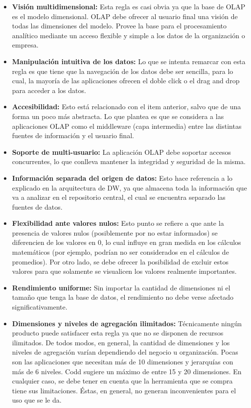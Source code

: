 \documentclass[a4paper,11pt]{article}
\begin{document}
\begin{flushleft}
    \begin{itemize}
      \item \textbf{Visión multidimensional:} Esta regla es casi obvia ya que la base de OLAP es el modelo dimensional. OLAP debe ofrecer al usuario final
      una visión de todas las dimensiones del modelo. Provee la base para el procesamiento analítico mediante un acceso flexible y simple a los datos de la 
      organización o empresa.
      \item \textbf{Manipulación intuitiva de los datos:} Lo que se intenta remarcar con esta regla es que tiene que la navegación de los datos debe ser
      sencilla, para lo cual, la mayoría de las aplicaciones ofrecen el doble click o el drag and drop para acceder a los datos.
      \item \textbf{Accesibilidad:} Esto está relacionado con el item anterior, salvo que de una forma un poco más abstracta. Lo que plantea es que se
      considera a las aplicaciones OLAP como el middleware (capa intermedia) entre las distintas fuentes de información y el usuario final.
      \item \textbf{Soporte de multi-usuario:} La aplicación OLAP debe soportar accesos concurrentes, lo que conlleva mantener la integridad y seguridad
      de la misma.
      \item \textbf{Información separada del origen de datos:} Esto hace referencia a lo explicado en la arquitectura de DW, ya que almacena toda la
      información que va a analizar en el repositorio central, el cual se encuentra separado las fuentes de datos.
      \item \textbf{Flexibilidad ante valores nulos:} Esto punto se refiere a que ante la presencia de valores nulos (posiblemente por no estar informados)
      se diferencien de los valores en 0, lo cual influye en gran medida en los cálculos matemáticos (por ejemplo, podrían no ser considerados en el cálculos
      de promedios). Por otro lado, se debe ofrecer la posibilidad de excluir estos valores para que solamente se visualicen los valores realmente
      importantes.
      \item \textbf{Rendimiento uniforme:} Sin importar la cantidad de dimensiones ni el tamaño que tenga la base de datos, el rendimiento no debe verse
      afectado significativamente.
      \item \textbf{Dimensiones y niveles de agregación ilimitados:} Técnicamente ningún producto puede satisfacer esta regla ya que no se disponen de
      recursos ilimitados. De todos modos, en general, la cantidad de dimensiones y los niveles de agregación varían dependiendo del negocio u organización.
      Pocas son las aplicaciones que necesitan más de 10 dimensiones y jerarquías con más de 6 niveles. Codd sugiere un máximo de entre 15 y 20 dimensiones.
      En cualquier caso, se debe tener en cuenta que la herramienta que se compra tiene sus limitaciones. Éstas, en general, no generan inconvenientes para
      el uso que se le da.
    \end{itemize}
    

\end{flushleft}
\end{document}
